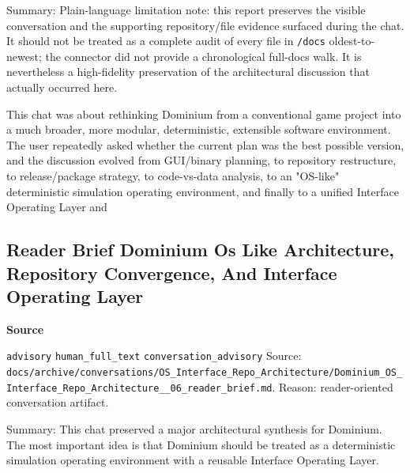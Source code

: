 \documentclass[9pt,a4paper,openany]{book}
\newcommand{\vonecallout}[3]{\par\medskip\noindent\begingroup\setlength{\fboxsep}{7pt}\colorbox{DomCalloutBg}{\parbox{0.94\linewidth}{\textbf{\textcolor{#1}{#2}}\par #3}}\endgroup\par\medskip}
\begin{document}
Summary: Plain-\allowbreak{}language limitation note: this report preserves the visible conversation and the supporting repository/\allowbreak{}file evidence surfaced during the chat.\allowbreak{} It should not be treated as a complete audit of every file in \texttt{/\allowbreak{}docs} oldest-\allowbreak{}to-\allowbreak{}newest; the connector did not provide a chronological full-\allowbreak{}docs walk.\allowbreak{} It is nevertheless a high-\allowbreak{}fidelity preservation of the architectural discussion that actually occurred here.\allowbreak{}


This chat was about rethinking Dominium from a conventional game project into a much broader, more modular, deterministic, extensible software environment.\allowbreak{} The user repeatedly asked whether the current plan was the best possible version, and the discussion evolved from GUI/\allowbreak{}binary planning, to repository restructure, to release/\allowbreak{}package strategy, to code-\allowbreak{}vs-\allowbreak{}data analysis, to an "OS-\allowbreak{}like" deterministic simulation operating environment, and finally to a unified Interface Operating Layer and



\subsection{Reader Brief Dominium Os Like Architecture, Repository Convergence, And Interface Operating Layer}

\vonecallout{DomSlate}{Source}{\texttt{advisory} \texttt{human\_\allowbreak{}full\_\allowbreak{}text} \texttt{conversation\_\allowbreak{}advisory} Source: \texttt{docs/\allowbreak{}archive/\allowbreak{}conversations/\allowbreak{}OS\_\allowbreak{}Interface\_\allowbreak{}Repo\_\allowbreak{}Architecture/\allowbreak{}Dominium\_\allowbreak{}OS\_\allowbreak{}Interface\_\allowbreak{}Repo\_\allowbreak{}Architecture\_\allowbreak{}\_\allowbreak{}06\_\allowbreak{}reader\_\allowbreak{}brief.\allowbreak{}md}.\allowbreak{} Reason: reader-\allowbreak{}oriented conversation artifact.\allowbreak{}}

Summary: This chat preserved a major architectural synthesis for Dominium.\allowbreak{} The most important idea is that Dominium should be treated as a deterministic simulation operating environment with a reusable Interface Operating Layer.\allowbreak{}
\end{document}
